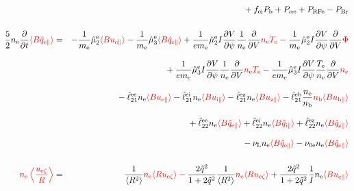 \documentclass[11pt]{article}
\def\r#1{{\rm#1}}
\def\ave#1{\left\langle#1\right\rangle}
\def\aves#1{\langle#1\rangle}
\def\dd#1#2{\frac{\partial #1}{\partial #2}}
\def\para{\parallel}
\def\ddV{\frac{\partial}{\partial V}}
\def\ddt{\frac{\partial}{\partial t}}
\def\me{m_\r{e}}
\def\mb{m_\r{b}}
\def\nee{n_\r{e}}
\def\nb{n_\r{b}}
\def\Te{T_\r{e}}
\def\uzt#1{u_{\r{#1}\zeta}}
\def\upara#1{u_{\r{#1}\para}}
\def\qhatpara#1{\hat{q}_{\r{#1}\para}}
\def\nun#1{\nu_\r{0#1}}
\def\PRF#1{P_\r{RF#1}}
\def\Palp#1{P_{\alpha\r{#1}}}
\def\fei{f_\r{ei}}
\def\PBr{P_\r{Br}}
\def\Pb{P_\r{b}}
\def\Eb{E_\r{b}}
\def\nuL{\nu_\r{L}}
\def\red#1{\textcolor{red}{#1}}
\begin{document}
\begin{eqnarray}
\nonumber\\[2.5mm]&&{}
%
  + \fei \Pb
%
%
  + \Palp{e}
%
  + \PRF{e}
%
  - \PBr
\\[5mm]
 \frac{5}{2} \nee \ddt \red{\aves{B \qhatpara{e}}} &=&
%
  - \frac{1}{\me} \hat{\mu}_2^\r{e} \red{\aves{B \upara{e}}}
  - \frac{1}{\me} \hat{\mu}_3^\r{e} \red{\aves{B \qhatpara{e}}}
%
  + \frac{1}{e\me} \hat{\mu}_2^\r{e} I \dd{V}{\psi} \frac{1}{\nee} \ddV
  \red{\nee \Te}
  - \frac{1}{\me} \hat{\mu}_2^\r{e} I \dd{V}{\psi} \ddV \red{\Phi}
\nonumber\\[3mm]&&{}
%
  + \frac{1}{e\me} \hat{\mu}_3^\r{e} I \dd{V}{\psi} \frac{1}{\nee} \ddV
  \red{\nee \Te}
  - \frac{1}{e\me} \hat{\mu}_3^\r{e} I \dd{V}{\psi} \frac{\Te}{\nee} \ddV
  \red{\nee}
\nonumber\\[3mm]&&{}
%
  - \hat{\ell}_{21}^{\r{ee}} \nee \red{\aves{B \upara{e}}}
  - \hat{\ell}_{21}^{\r{ei}} \nee \red{\aves{B \upara{i}}}
  - \hat{\ell}_{21}^{\r{ez}} \nee \red{\aves{B \upara{z}}}
  - \hat{\ell}_{21}^{\r{eb}} \frac{\nee}{\nb} \red{\nb \aves{B \upara{b}}}
\nonumber\\[3mm]&&{}
%
  + \hat{\ell}_{22}^{\r{ee}} \nee \red{\aves{B \qhatpara{e}}}
  + \hat{\ell}_{22}^{\r{ei}} \nee \red{\aves{B \qhatpara{i}}}
  + \hat{\ell}_{22}^{\r{ez}} \nee \red{\aves{B \qhatpara{z}}}
\nonumber\\[3mm]&&{}
%
  - \nuL \nee \red{\aves{B \qhatpara{e}}}
%
  - \nun{e} \nee \red{\aves{B \qhatpara{e}}}
\\[5mm]
    \red{\nee \ave{\frac{\uzt{e}}{R}}} &=&
%
    \frac{1}{\aves{R^2}} \red{\nee \aves{R\uzt{e}}}
%
  - \frac{2\hat{q}^2}{1+2\hat{q}^2} \frac{1}{\aves{R^2}}\red{\nee\aves{R\uzt{e}}}
%
  + \frac{2\hat{q}^2}{1+2\hat{q}^2} \frac{1}{I}\nee \red{\aves{B\upara{e}}}
\end{eqnarray}
%

\clearpage
\end{document}
